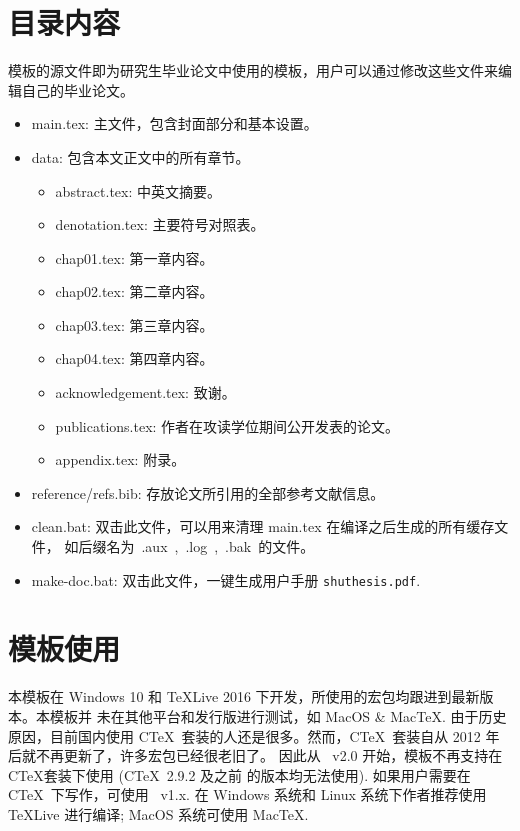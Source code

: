 \section{目录内容}
模板的源文件即为研究生毕业论文中使用的模板，用户可以通过修改这些文件来编辑自己的毕业论文。
\begin{itemize}
\item{main.tex}: 主文件，包含封面部分和基本设置。
\item{data}: 包含本文正文中的所有章节。
\begin{itemize}
\item{abstract.tex}: 中英文摘要。
\item{denotation.tex}: 主要符号对照表。
\item{chap01.tex}: 第一章内容。
\item{chap02.tex}: 第二章内容。
\item{chap03.tex}: 第三章内容。
\item{chap04.tex}: 第四章内容。
\item{acknowledgement.tex}: 致谢。
\item{publications.tex}: 作者在攻读学位期间公开发表的论文。
\item{appendix.tex}: 附录。
\end{itemize}
\item{reference/refs.bib}: 存放论文所引用的全部参考文献信息。
\item{clean.bat}: 双击此文件，可以用来清理 main.tex 在编译之后生成的所有缓存文件，
如后缀名为~.aux~,~.log~,~.bak~的文件。
\item{make-doc.bat}: 双击此文件，一键生成用户手册 \texttt{shuthesis.pdf}.
\end{itemize}


\section{模板使用}
\label{sec:first}

本模板在 Windows 10 和 \TeX Live 2016 下开发，所使用的宏包均跟进到最新版本。本模板并
未在其他平台和发行版进行测试，如 MacOS \& Mac\TeX. 由于历史原因，目前国内使用 C\TeX\ 
套装的人还是很多。然而，C\TeX\ 套装自从 2012 年后就不再更新了，许多宏包已经很老旧了。
因此从 \shuthesis\ v2.0 开始，模板不再支持在 C\TeX 套装下使用 (C\TeX\ 2.9.2 及之前
的版本均无法使用). 如果用户需要在 C\TeX\ 下写作，可使用 \shuthesis\ v1.x. 在 Windows 
系统和 Linux 系统下作者推荐使用 \TeX Live 进行编译; MacOS 系统可使用 Mac\TeX. 










